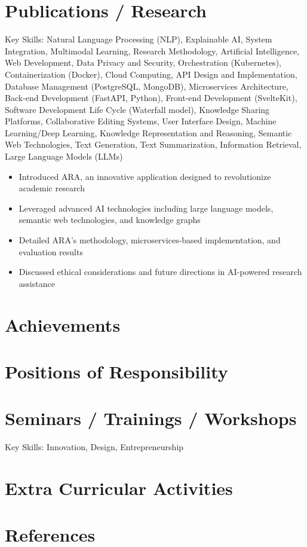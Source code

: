 \documentclass[11pt,a4paper,sans]{moderncv}
\newcommand{\customsection}[1]{%
  \section{\textcolor{color1}{\textbf{#1}}}%
}
\begin{document}
\customsection{Publications / Research}
{Key Skills: Natural Language Processing (NLP), Explainable AI, System Integration, Multimodal Learning, Research Methodology, Artificial Intelligence, Web Development, Data Privacy and Security, Orchestration (Kubernetes), Containerization (Docker), Cloud Computing, API Design and Implementation, Database Management (PostgreSQL, MongoDB), Microservices Architecture, Back-end Development (FastAPI, Python), Front-end Development (SvelteKit), Software Development Life Cycle (Waterfall model), Knowledge Sharing Platforms, Collaborative Editing Systems, User Interface Design, Machine Learning/Deep Learning, Knowledge Representation and Reasoning, Semantic Web Technologies, Text Generation, Text Summarization, Information Retrieval, Large Language Models (LLMs)
\begin{itemize}
\item Introduced ARA, an innovative application designed to revolutionize academic research
\item Leveraged advanced AI technologies including large language models, semantic web technologies, and knowledge graphs
\item Detailed ARA's methodology, microservices-based implementation, and evaluation results
\item Discussed ethical considerations and future directions in AI-powered research assistance
\end{itemize}}

\customsection{Achievements}

\customsection{Positions of Responsibility}

\customsection{Seminars / Trainings / Workshops}
{Key Skills: Innovation, Design, Entrepreneurship}

\customsection{Extra Curricular Activities}

\customsection{References}
\end{document}
